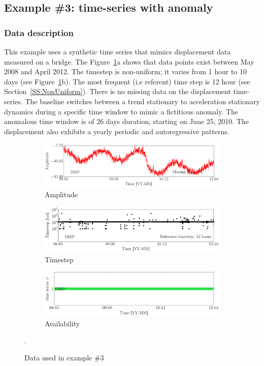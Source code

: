\subsection{Example \#3: time-series with anomaly}
\label{S:ExampleDispAnomaly}


\subsubsection{Data description}
This example uses a synthetic time series that mimics displacement data measured on a bridge. 
The Figure~\ref{fig:DataSummaryRaw3}a shows that data points exist between May 2008 and April 2012.
The timestep is non-uniform; it varies from 1 hour to 10 days (see Figure~\ref{fig:DataSummaryRaw3}b). 
The most frequent (i.e referent) time step is 12 hour (see Section~\ref{SS:NonUniform}).
There is no missing data on the displacement time-series.
The baseline switches between a trend stationary to acceleration stationary dynamics during a specific time window to mimic a fictitious anomaly.
The anomalous time window is of 26 days duration, starting on June 25, 2010.
The displacement also exhibits a yearly periodic and autoregressive patterns.

\begin{figure}[h!]
\centering
\begin{subfigure}{\linewidth}
\includegraphics[width=0.9\linewidth]{./docfigs/Example_DISPSIM_ANOMALY/raw/ALL_AMPLITUDES.pdf} 
\caption{Amplitude}
\end{subfigure}
\begin{subfigure}{\linewidth}
\includegraphics[width=0.9\linewidth]{./docfigs/Example_DISPSIM_ANOMALY/raw/ALL_TIMESTEPS.pdf}
\caption{Timestep}
\end{subfigure}
\begin{subfigure}{\linewidth}
\includegraphics[width=0.9\linewidth]{./docfigs/Example_DISPSIM_ANOMALY/raw/AVAILABILITY.pdf}
\caption{Availability}
\end{subfigure}
\caption{Data used in example \#3}.
\label{fig:DataSummaryRaw3}
\end{figure}



